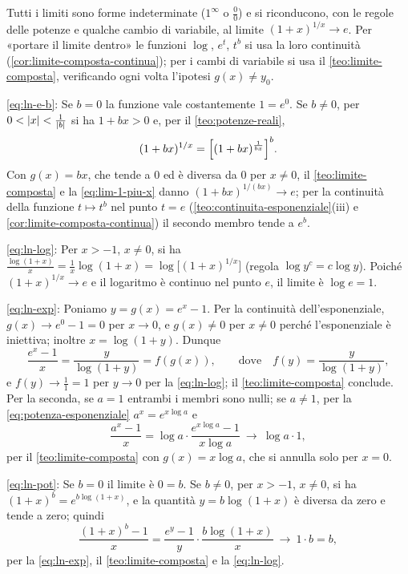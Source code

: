 \begin{schema}
\Tesi{i limiti \eqref{eq:ln-e-b}--\eqref{eq:ln-pot}.}
\end{schema}

\begin{strategia}
Tutti i limiti sono forme indeterminate ($1^{\infty}$ o $\frac00$) e si riconducono, con
le regole delle potenze e qualche cambio di variabile, al limite
$(1+x)^{1/x}\to e$. Per «portare il limite dentro» le funzioni $\log$, $e^{t}$, $t^{b}$ si
usa la loro continuità (\cref{cor:limite-composta-continua}); per i cambi di variabile
si usa il \cref{teo:limite-composta}, verificando ogni volta l'ipotesi $g(x)\neq y_{0}$.
\end{strategia}

\begin{dimostrazione}
\eqref{eq:ln-e-b}: Se $b=0$ la funzione vale costantemente $1=e^{0}$. Se $b\neq0$, per
$0<\lvert x\rvert<\frac1{\lvert b\rvert}$ si ha $1+bx>0$ e, per il \cref{teo:potenze-reali},
\[
  (1+bx)^{1/x}=\Bigl[(1+bx)^{\frac1{bx}}\Bigr]^{b}.
\]
Con $g(x)=bx$, che tende a $0$ ed è diversa da $0$ per $x\neq0$, il
\cref{teo:limite-composta} e la \eqref{eq:lim-1-piu-x} danno $(1+bx)^{1/(bx)}\to e$;
per la continuità della funzione $t\mapsto t^{b}$ nel punto $t=e$
(\cref{teo:continuita-esponenziale}(iii) e \cref{cor:limite-composta-continua}) il
secondo membro tende a $e^{b}$.

\eqref{eq:ln-log}: Per $x>-1$, $x\neq0$, si ha
$\frac{\log(1+x)}x=\frac1x\log(1+x)=\log\bigl[(1+x)^{1/x}\bigr]$ (regola $\log y^{c}=c\log y$).
Poiché $(1+x)^{1/x}\to e$ e il logaritmo è continuo nel punto $e$, il limite è
$\log e=1$.

\eqref{eq:ln-exp}: Poniamo $y=g(x)=e^{x}-1$. Per la continuità dell'esponenziale,
$g(x)\to e^{0}-1=0$ per $x\to0$, e $g(x)\neq0$ per $x\neq0$ perché l'esponenziale è
iniettiva; inoltre $x=\log(1+y)$. Dunque
\[
  \frac{e^{x}-1}{x}=\frac{y}{\log(1+y)}=f(g(x)), \qquad\text{dove}\quad
  f(y)=\frac{y}{\log(1+y)},
\]
e $f(y)\to\frac11=1$ per $y\to0$
per la \eqref{eq:ln-log}; il \cref{teo:limite-composta} conclude. Per la seconda, se
$a=1$ entrambi i membri sono nulli; se $a\neq1$, per la \eqref{eq:potenza-esponenziale}
$a^{x}=e^{x\log a}$ e
\[
  \frac{a^{x}-1}{x}=\log a\cdot\frac{e^{x\log a}-1}{x\log a}\ \to\ \log a\cdot1,
\]
per il \cref{teo:limite-composta} con $g(x)=x\log a$, che si annulla solo per $x=0$.

\eqref{eq:ln-pot}: Se $b=0$ il limite è $0=b$. Se $b\neq0$, per $x>-1$, $x\neq0$, si
ha $(1+x)^{b}=e^{b\log(1+x)}$, e la quantità $y=b\log(1+x)$ è diversa da zero e tende a
zero; quindi
\[
  \frac{(1+x)^{b}-1}{x}=\frac{e^{y}-1}{y}\cdot\frac{b\log(1+x)}{x}\ \to\ 1\cdot b=b,
\]
per la \eqref{eq:ln-exp}, il \cref{teo:limite-composta} e la \eqref{eq:ln-log}.
\end{dimostrazione}

